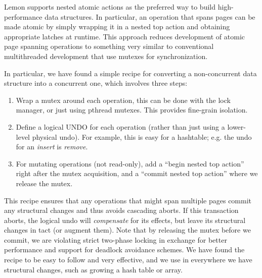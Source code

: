 \documentclass[letterpaper,twocolumn,english]{article}
\newcommand{\yad}{Lemon\xspace}
\begin{document}
\yad supports nested atomic actions as the preferred way to build
high-performance data structures. In particular, an operation that
spans pages can be made atomic by simply wrapping it in a nested top
action and obtaining appropriate latches at runtime.  This approach
reduces development of atomic page spanning operations to something
very similar to conventional multithreaded development that use mutexes
for synchronization.

In particular, we have found a simple recipe for converting a
non-concurrent data structure into a concurrent one, which involves
three steps:
\begin{enumerate}
\item Wrap a mutex around each operation, this can be done with the lock
  manager, or just using pthread mutexes.  This provides fine-grain isolation.
\item Define a logical UNDO for each operation (rather than just using
  a lower-level physical undo).  For example, this is easy for a
  hashtable; e.g. the undo for an {\em insert} is {\em remove}.
\item For mutating operations (not read-only), add a ``begin nested
  top action'' right after the mutex acquisition, and a ``commit
  nested top action'' where we release the mutex.
\end{enumerate}
This recipe ensures that any operations that might span multiple pages
commit any structural changes and thus avoids cascading aborts.  If
this transaction aborts, the logical undo will {\em compensate} for
its effects, but leave its structural changes in tact (or augment
them). Note that by releasing the mutex before we commit, we are
violating strict two-phase locking in exchange for better performance 
and support for deadlock avoidance schemes.
We have found the recipe to be easy to follow and very effective, and
we use in everywhere we have structural changes, such as growing a
hash table or array.


\end{document}

